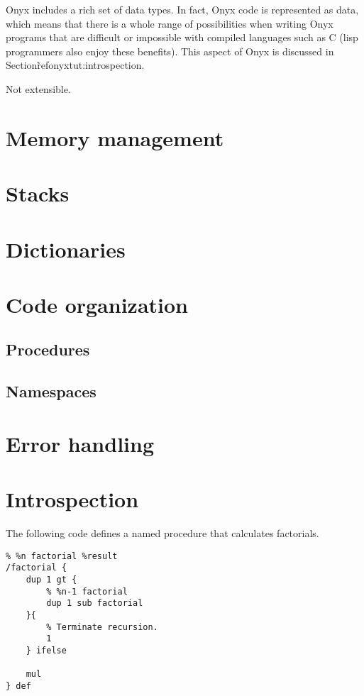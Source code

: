 Onyx includes a rich set of data types.  In fact, Onyx code is represented as
data, which means that there is a whole range of possibilities when writing Onyx
programs that are difficult or impossible with compiled languages such as C
(lisp programmers also enjoy these benefits).  This aspect of Onyx is discussed
in Section\~ref{onyxtut:introspection}.



Not extensible.


\section{Memory management}

\section{Stacks}
\section{Dictionaries}

\section{Code organization}
\subsection{Procedures}
\subsection{Namespaces}

\section{Error handling}

\section{Introspection}
\label{onyxtut:introspection}

The following code defines a named procedure that calculates factorials.

\begin{verbatim}
% %n factorial %result
/factorial {
    dup 1 gt {
        % %n-1 factorial
        dup 1 sub factorial
    }{
        % Terminate recursion.
        1
    } ifelse

    mul
} def
\end{verbatim}

